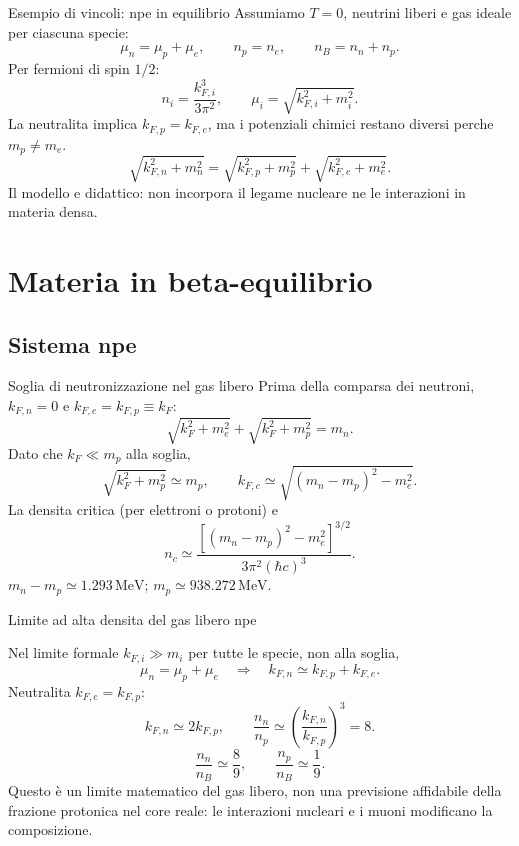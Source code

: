 \begin{frame}[t]{Esempio di vincoli: npe in equilibrio}
\vspace*{3mm}
\small
Assumiamo $T=0$, neutrini liberi e gas ideale per ciascuna specie:
\[
\mu_n=\mu_p+\mu_e,\qquad n_p=n_e,\qquad n_B=n_n+n_p.
\]
Per fermioni di spin $1/2$:
\[
n_i=\frac{k_{F,i}^3}{3\pi^2},\qquad
\mu_i=\sqrt{k_{F,i}^2+m_i^2}.
\]
La neutralita implica $k_{F,p}=k_{F,e}$, ma i potenziali chimici restano diversi perche $m_p\ne m_e$.
\[
\sqrt{k_{F,n}^2+m_n^2}=\sqrt{k_{F,p}^2+m_p^2}
 +\sqrt{k_{F,e}^2+m_e^2}.
\]
Il modello e didattico: non incorpora il legame nucleare ne le interazioni in materia densa.
\end{frame}

\section{Materia in beta-equilibrio}

\subsection{Sistema npe}

\begin{frame}[t]{Soglia di neutronizzazione nel gas libero}
\vspace*{3mm}
\small
Prima della comparsa dei neutroni, $k_{F,n}=0$ e $k_{F,e}=k_{F,p}\equiv k_F$:
\[
\sqrt{k_F^2+m_e^2}+\sqrt{k_F^2+m_p^2}=m_n.
\]
Dato che $k_F\ll m_p$ alla soglia,
\[
\sqrt{k_F^2+m_p^2}\simeq m_p,
\qquad
k_{F,c}\simeq\sqrt{(m_n-m_p)^2-m_e^2}.
\]
La densita critica (per elettroni o protoni) e
\[
\boxed{n_c\simeq\frac{[(m_n-m_p)^2-m_e^2]^{3/2}}{3\pi^2(\hbar c)^3}.}
\]
$m_n-m_p\simeq1.293\,\mathrm{MeV}$; $m_p\simeq938.272\,\mathrm{MeV}$.
\end{frame}

\begin{frame}[t]{Limite ad alta densita del gas libero npe}
\vspace*{3mm}
\small

Nel limite formale $k_{F,i}\gg m_i$ per tutte le specie, non alla soglia,
\[
\mu_n=\mu_p+\mu_e\quad\Longrightarrow\quad
k_{F,n}\simeq k_{F,p}+k_{F,e}.
\]
Neutralita $k_{F,e}=k_{F,p}$:
\[
k_{F,n}\simeq2k_{F,p},\qquad
\frac{n_n}{n_p}\simeq\left(\frac{k_{F,n}}{k_{F,p}}\right)^3=8.
\]
\[
\boxed{\frac{n_n}{n_B}\simeq\frac89,\qquad\frac{n_p}{n_B}\simeq\frac19.}
\]
Questo \`e un limite matematico del gas libero, non una previsione affidabile della frazione protonica nel core reale: le interazioni nucleari e i muoni modificano la composizione.
\end{frame}

